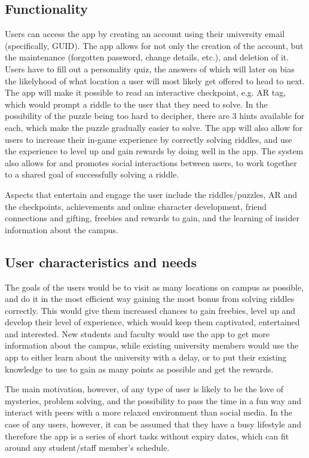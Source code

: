 \documentclass[10pt,twocolumn]{article} %
\begin{document}
\subsection*{Functionality}
Users can access the app by creating an account using their university email (specifically, GUID). The app allows for not only the creation of the account, but the maintenance (forgotten password, change details, etc.), and deletion of it. Users have to fill out a personality quiz, the answers of which will later on bias the likelyhood of what location a user will most likely get offered to head to next. The app will make it possible to read an interactive checkpoint, e.g. AR tag, which would prompt a riddle to the user that they need to solve. In the possibility of the puzzle being too hard to decipher, there are 3 hints available for each, which make the puzzle gradually easier to solve. The app will also allow for users to increase their in-game experience by correctly solving riddles, and use the experience to level up and gain rewards by doing well in the app. The system also allows for and promotes social interactions between users, to work together to a shared goal of successfully solving a riddle.

Aspects that entertain and engage the user include the riddles/puzzles, AR and the checkpoints, achievements and online character development, friend connections and gifting, freebies and rewards to gain, and the learning of insider information about the campus.

\subsection*{User characteristics and needs}
The goals of the users would be to visit as many locations on campus as possible, and do it in the most efficient way gaining the most bonus from solving riddles correctly. This would give them increased chances to gain freebies, level up and develop their level of experience, which would keep them captivated, entertained and interested. New students and faculty would use the app to get more information about the campus, while existing university members would use the app to either learn about the university with a delay, or to put their existing knowledge to use to gain as many points as possible and get the rewards.

The main motivation, however, of any type of user is likely to be the love of mysteries, problem solving, and the possibility to pass the time in a fun way and interact with peers with a more relaxed environment than social media. In the case of any users, however, it can be assumed that they have a busy lifestyle and therefore the app is a series of short tasks without expiry dates, which can fit around any student/staff member's schedule.
\end{document}
